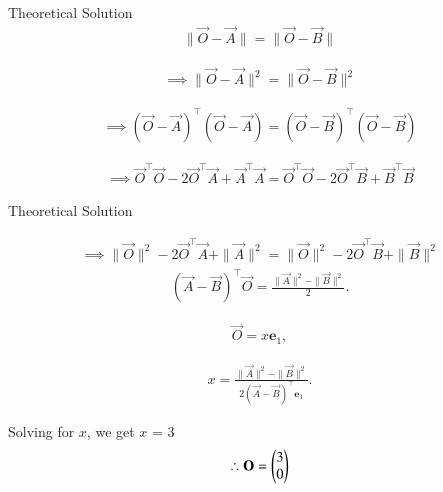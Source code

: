 \documentclass{beamer}
\begin{document}
\begin{frame}{Theoretical Solution}
\begin{align}
\|\vec{O}-\vec{A}\|=\|\vec{O}-\vec{B}\|
\end{align}

\begin{align}
\implies \|\vec{O}-\vec{A}\|^2 = \|\vec{O}-\vec{B}\|^2
\end{align}

\begin{align}
\implies (\vec{O}-\vec{A})^{\top}(\vec{O}-\vec{A}) = (\vec{O}-\vec{B})^{\top}(\vec{O}-\vec{B})
\end{align}

\begin{align}
\implies \vec{O}^{\top}\vec{O} - 2\vec{O}^{\top}\vec{A} + \vec{A}^{\top}\vec{A}
= \vec{O}^{\top}\vec{O} - 2\vec{O}^{\top}\vec{B} + \vec{B}^{\top}\vec{B}
\end{align}

\end{frame}
\begin{frame}{Theoretical Solution}

\begin{align}
\implies \|\vec{O}\|^2 - 2\vec{O}^{\top}\vec{A} + \|\vec{A}\|^2
= \|\vec{O}\|^2 - 2\vec{O}^{\top}\vec{B} + \|\vec{B}\|^2
\end{align}
\begin{align}
    (\vec{A}-\vec{B})^{\top}\vec{O}=\frac{\|\vec{A}\|^2-\|\vec{B}\|^2}{2}.
\end{align}

\begin{align}
     \vec{O} = x \mathbf{e}_1,
\end{align}

\begin{align}
    x = \frac{\|\vec{A}\|^2 - \|\vec{B}\|^2}{2 (\vec{A} - \vec{B})^{\top} \mathbf{e}_1}.
\end{align}

Solving for $x$, we get $x$ = $3$\\

\begin{align}
    \therefore \vec{O} = \myvec{$3$ \\ $0$}
\end{align}
\end{frame}
\end{document}
